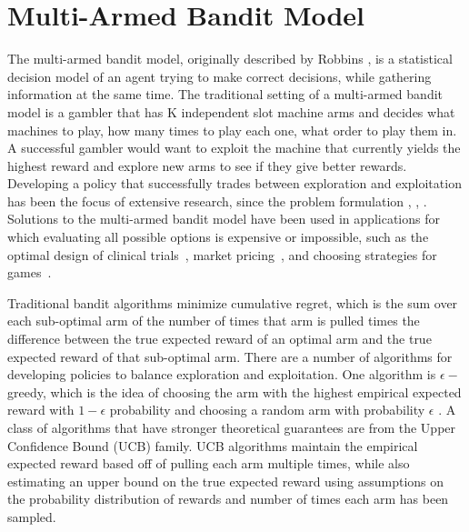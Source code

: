 \documentclass[letterpaper, 10 pt, conference]{ieeeconf}  %
\begin{document}
\section{Multi-Armed Bandit Model}
The multi-armed bandit model, originally described by Robbins \cite{robbins1985some}, is a statistical decision model of an agent trying to make correct decisions, while gathering information at the same time.
The traditional setting of a multi-armed bandit model is a gambler that has K independent slot machine arms and decides what machines to play, how many times to play each one, what order to play them in.
A successful gambler would want to exploit the machine that currently yields the highest reward and explore new arms to see if they give better rewards.
Developing a policy that successfully trades between exploration and exploitation has been the focus of extensive research, since the problem formulation \cite{bubeck2009pure}, \cite{robbins1952some}, \cite{bergemann2006bandit}. Solutions to the multi-armed bandit model have been used in applications for which evaluating all possible options is expensive or impossible, such as the optimal design of clinical trials~\cite{simon1989optimal}, market pricing~\cite{rothschild1974two}, and choosing strategies for games~\cite{st2012online}. 

Traditional bandit algorithms minimize cumulative regret, which is the sum over each sub-optimal arm of the number of times that arm is pulled times the difference between the true expected reward of an optimal arm and the true expected reward of that sub-optimal arm. There are a number of algorithms for developing policies to balance exploration and exploitation.
One algorithm is $\epsilon-$greedy, which is the idea of choosing the arm with the highest empirical expected reward with $1-\epsilon$ probability and choosing a random arm with probability $\epsilon$ \cite{barto1998reinforcement}.
A class of algorithms that have stronger theoretical guarantees are from the Upper Confidence Bound (UCB) family.
UCB algorithms maintain the empirical expected reward based off of pulling each arm multiple times, while also estimating an upper bound on the true expected reward using assumptions on the probability distribution of rewards and number of times each arm has been sampled. 

\end{document}
